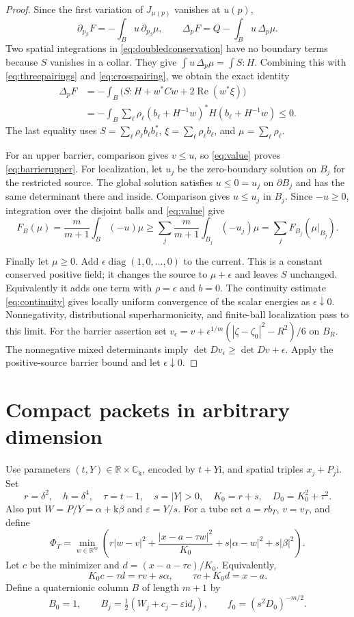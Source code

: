 \documentclass[11pt]{article}
\numberwithin{equation}{section}
\newcommand{\R}{\mathbb R}
\newcommand{\C}{\mathbb C}
\newcommand{\Rea}{\operatorname{Re}}
\begin{document}
\begin{proof}
Since the first variation of $J_{\mu(p)}$ vanishes at $u(p)$,
\[
 \partial_{p_\beta}F=-\int_Bu\,\partial_{p_\beta}\mu,\qquad
 \Delta_pF=Q-\int_Bu\,\Delta_p\mu.
\]
Two spatial integrations in \eqref{eq:doubledconservation} have no
boundary terms because $S$ vanishes in a collar. They give
$\int u\,\Delta_p\mu=\int S:H$.
Combining this with \eqref{eq:threepairings} and
\eqref{eq:crosspairing}, we obtain the exact identity
\begin{align}
 \Delta_pF
 &=-\int_B\big(S:H+w^*Cw+2\Rea(w^*\xi)\big)\nonumber\\
 &=-\int_B\sum_\ell\rho_\ell
       (b_\ell+H^{-1}w)^*H(b_\ell+H^{-1}w)\le0.
       \label{eq:energyidentity}
\end{align}
The last equality uses
$S=\sum_\ell\rho_\ell b_\ell b_\ell^*$,
$\xi=\sum_\ell\rho_\ell b_\ell$, and
$\mu=\sum_\ell\rho_\ell$.

For an upper barrier, comparison gives $v\le u$, so
\eqref{eq:value} proves \eqref{eq:barrierupper}.
For localization, let $u_j$ be the zero-boundary solution on $B_j$
for the restricted source. The global solution satisfies $u\le0=u_j$
on $\partial B_j$ and has the same determinant there and inside.
Comparison gives $u\le u_j$ in $B_j$.
Since $-u\ge0$, integration over the disjoint balls and
\eqref{eq:value} give
\[
 F_B(\mu)=\frac{m}{m+1}\int_B(-u)\mu
 \ge\sum_j\frac{m}{m+1}\int_{B_j}(-u_j)\mu
 =\sum_jF_{B_j}(\mu|_{B_j}).
\]

Finally let $\mu\ge0$. Add
$\epsilon\operatorname{diag}(1,0,\ldots,0)$ to the current.
This is a constant conserved positive field; it changes the source
to $\mu+\epsilon$ and leaves $S$ unchanged. Equivalently it adds
one term with $\rho=\epsilon$ and $b=0$.
The continuity estimate \eqref{eq:continuity} gives locally uniform
convergence of the scalar energies as $\epsilon\downarrow0$.
Nonnegativity, distributional superharmonicity, and finite-ball
localization pass to this limit.
For the barrier assertion set
$v_\epsilon=v+\epsilon^{1/m}(|\zeta-\zeta_0|^2-R^2)/6$ on $B_R$.
The nonnegative mixed determinants imply
$\det Dv_\epsilon\ge\det Dv+\epsilon$.
Apply the positive-source barrier bound and let $\epsilon\downarrow0$.
\end{proof}

\section{Compact packets in arbitrary dimension}

Use parameters $(t,Y)\in\R\times\C_{\mathrm{k}}$, encoded by
$t+Y\mathrm{i}$, and spatial triples $x_j+P_j\mathrm{i}$.
Set
\[
 r=\delta^2,\quad h=\delta^4,\quad \tau=t-1,\quad s=|Y|>0,
 \quad K_0=r+s,\quad D_0=K_0^2+\tau^2.
\]
Also put $W=P/Y=\alpha+\mathrm{k}\beta$ and $\varepsilon=Y/s$.
For a tube set $a=rb_T$, $v=v_T$, and define
\[
 \Phi_T=\min_{w\in\R^m}\left(
 r|w-v|^2+\frac{|x-a-\tau w|^2}{K_0}
                 +s|\alpha-w|^2+s|\beta|^2\right).
\]
Let $c$ be the minimizer and $d=(x-a-\tau c)/K_0$. Equivalently,
\[
 K_0c-\tau d=rv+s\alpha,\qquad \tau c+K_0d=x-a.
\]
Define a quaternionic column $B$ of length $m+1$ by
\[
 B_0=1,\qquad B_j=\tfrac12(W_j+c_j-\varepsilon\mathrm{i} d_j),
 \qquad f_0=(s^2D_0)^{-m/2}.
\]
\end{document}
